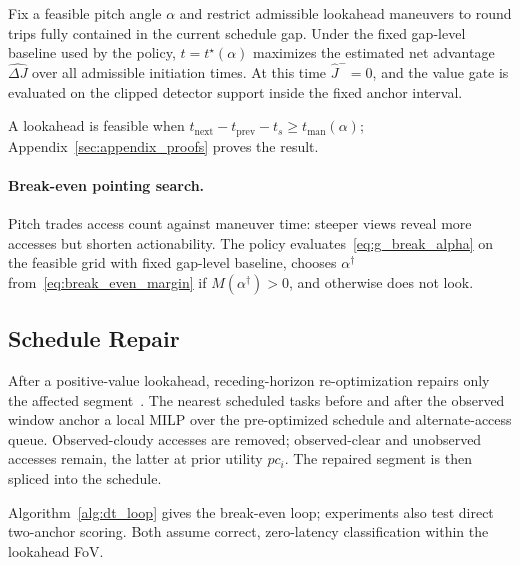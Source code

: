 \begin{proposition}
\label{prop:timing}
Fix a feasible pitch angle $\alpha$ and restrict admissible lookahead maneuvers to round trips fully contained in the current schedule gap. Under the fixed gap-level baseline used by the policy, $t = t^\star(\alpha)$ maximizes the estimated net advantage $\widehat{\Delta J}$ over all admissible initiation times. At this time $\hat{J}^- = 0$, and the value gate is evaluated on the clipped detector support inside the fixed anchor interval.
\end{proposition}

A lookahead is feasible when $t_{\mathrm{next}}-t_{\mathrm{prev}}-t_s\geq t_{\mathrm{man}}(\alpha)$; Appendix~\ref{sec:appendix_proofs} proves the result.

\paragraph{Break-even pointing search.}
\label{sec:joint_opt}
Pitch trades access count against maneuver time: steeper views reveal more accesses but shorten actionability. The policy evaluates~\eqref{eq:g_break_alpha} on the feasible grid with fixed gap-level baseline, chooses $\alpha^\dagger$ from~\eqref{eq:break_even_margin} if $M(\alpha^\dagger)>0$, and otherwise does not look.

\subsection{Schedule Repair}
\label{sec:schedule_repair}

After a positive-value lookahead, receding-horizon re-optimization repairs only the affected segment~\citep{boerkoel_efficient_2021,nag_autonomous_2019,augenstein_optimal_2016}. The nearest scheduled tasks before and after the observed window anchor a local MILP over the pre-optimized schedule and alternate-access queue. Observed-cloudy accesses are removed; observed-clear and unobserved accesses remain, the latter at prior utility $pc_i$. The repaired segment is then spliced into the schedule.

Algorithm~\ref{alg:dt_loop} gives the break-even loop; experiments also test direct two-anchor scoring. Both assume correct, zero-latency classification within the lookahead FoV.

